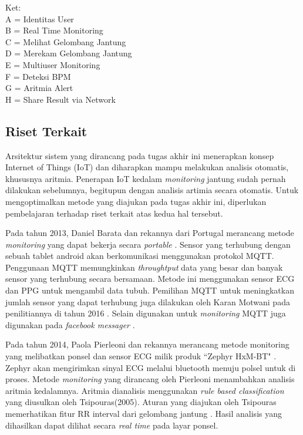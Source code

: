 Ket: \\
A = Identitas User \\
B = Real Time Monitoring \\
C = Melihat Gelombang Jantung \\
D = Merekam Gelombang Jantung \\
E = Multiuser Monitoring \\
F = Deteksi BPM \\
G = Aritmia Alert \\
H = Share Result via Network \\

\subsection{Riset Terkait}
Arsitektur sistem yang dirancang pada tugas akhir ini menerapkan konsep Internet of Things (IoT) dan diharapkan mampu melakukan analisis otomatis, khususnya aritmia. Penerapan IoT kedalam \textit{monitoring} jantung sudah pernah dilakukan sebelumnya, begitupun dengan analisis artimia secara otomatis. Untuk mengoptimalkan metode yang diajukan pada tugas akhir ini, diperlukan pembelajaran terhadap riset terkait atas kedua hal tersebut.

Pada tahun 2013, Daniel Barata dan rekannya dari Portugal merancang metode \textit{monitoring} yang dapat bekerja secara \textit{portable} \cite{daniel_barataa}. Sensor yang terhubung dengan sebuah tablet android akan berkomunikasi menggunakan protokol MQTT. Penggunaan MQTT memungkinkan \textit{throughtput} data yang besar dan banyak sensor yang terhubung secara bersamaan. Metode ini menggunakan sensor ECG dan PPG untuk mengambil data tubuh. Pemilihan MQTT untuk meningkatkan jumlah sensor yang dapat terhubung juga dilakukan oleh Karan Motwani pada penilitiannya di tahun 2016 \cite{karan_motwani}. Selain digunakan untuk \textit{monitoring} MQTT juga digunakan pada \textit{facebook messager} \cite{mqtt_use}.

Pada tahun 2014, Paola Pierleoni dan rekannya merancang metode monitoring yang melibatkan ponsel dan sensor ECG milik produk ``Zephyr HxM-BT" \cite{paola_pierleoni}. Zephyr akan mengirimkan sinyal ECG melalui bluetooth menuju polsel untuk di proses. Metode \textit{monitoring} yang dirancang oleh Pierleoni menambahkan analisis aritmia kedalamnya. Aritmia dianalisis menggunakan \textit{rule based classification} yang diusulkan oleh Tsipouras(2005). Aturan yang diajukan oleh Tsipouras memerhatikan fitur RR interval dari gelombang jantung \cite{rr_classification}. Hasil analisis yang dihasilkan dapat dilihat secara \textit{real time} pada layar ponsel.

